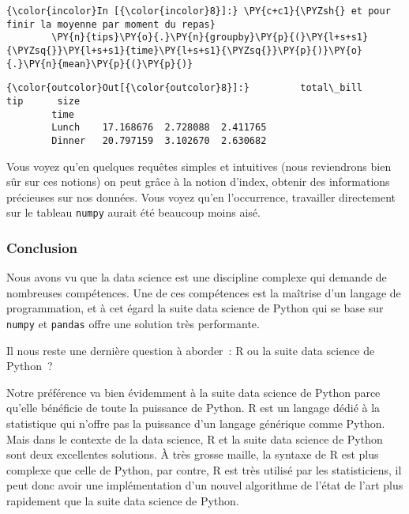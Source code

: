     \begin{Verbatim}[commandchars=\\\{\}]
{\color{incolor}In [{\color{incolor}8}]:} \PY{c+c1}{\PYZsh{} et pour finir la moyenne par moment du repas}
        \PY{n}{tips}\PY{o}{.}\PY{n}{groupby}\PY{p}{(}\PY{l+s+s1}{\PYZsq{}}\PY{l+s+s1}{time}\PY{l+s+s1}{\PYZsq{}}\PY{p}{)}\PY{o}{.}\PY{n}{mean}\PY{p}{(}\PY{p}{)}
\end{Verbatim}


\begin{Verbatim}[commandchars=\\\{\}]
{\color{outcolor}Out[{\color{outcolor}8}]:}         total\_bill       tip      size
        time                                  
        Lunch    17.168676  2.728088  2.411765
        Dinner   20.797159  3.102670  2.630682
\end{Verbatim}
            
    Vous voyez qu'en quelques requêtes simples et intuitives (nous
reviendrons bien sûr sur ces notions) on peut grâce à la notion d'index,
obtenir des informations précieuses sur nos données. Vous voyez qu'en
l'occurrence, travailler directement sur le tableau \texttt{numpy}
aurait été beaucoup moins aisé.

    \hypertarget{conclusion}{%
\subsubsection{Conclusion}\label{conclusion}}

    Nous avons vu que la data science est une discipline complexe qui
demande de nombreuses compétences. Une de ces compétences est la
maîtrise d'un langage de programmation, et à cet égard la suite data
science de Python qui se base sur \texttt{numpy} et \texttt{pandas}
offre une solution très performante.

    Il nous reste une dernière question à aborder~: R ou la suite data
science de Python~?

Notre préférence va bien évidemment à la suite data science de Python
parce qu'elle bénéficie de toute la puissance de Python. R est un
langage dédié à la statistique qui n'offre pas la puissance d'un langage
générique comme Python. Mais dans le contexte de la data science, R et
la suite data science de Python sont deux excellentes solutions. À très
grosse maille, la syntaxe de R est plus complexe que celle de Python,
par contre, R est très utilisé par les statisticiens, il peut donc avoir
une implémentation d'un nouvel algorithme de l'état de l'art plus
rapidement que la suite data science de Python.


    
    
    
